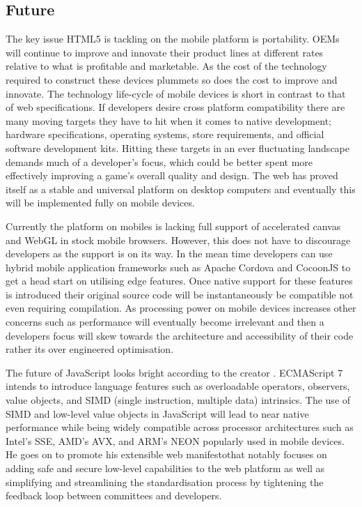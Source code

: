 \documentclass[final]{cmpreport}
\begin{document}
\subsection{Future}
The key issue HTML5 is tackling on the mobile platform is portability. OEMs will continue to improve and innovate their product lines at different rates relative to what is profitable and marketable. As the cost of the technology required to construct these devices plummets so does the cost to improve and innovate. The technology life-cycle of mobile devices is short in contrast to that of web specifications. If developers desire cross platform compatibility there are many moving targets they have to hit when it comes to native development; hardware specifications, operating systems, store requirements, and official software development kits. Hitting these targets in an ever fluctuating landscape demands much of a developer's focus, which could be better spent more effectively improving a game's overall quality and design. The web has proved itself as a stable and universal platform on desktop computers and eventually this will be implemented fully on mobile devices.

Currently the platform on mobiles is lacking full support of accelerated canvas and WebGL in stock mobile browsers. However, this does not have to discourage developers as the support is on its way. In the mean time developers can use hybrid mobile application frameworks such as Apache Cordova and CocoonJS to get a head start on utilising edge features. Once native support for these features is introduced their original source code will be instantaneously be compatible not even requiring compilation. As processing power on mobile devices increases other concerns such as performance will eventually become irrelevant and then a developers focus will skew towards the architecture and accessibility of their code rather its over engineered optimisation.

The future of JavaScript looks bright according to the creator \citet{Eich}. ECMAScript 7 intends to introduce language features such as overloadable operators, observers, value objects, and SIMD (single instruction, multiple data) intrinsics. The use of SIMD and low-level value objects in JavaScript will lead to near native performance while being widely compatible across processor architectures such as Intel's SSE, AMD's AVX, and ARM's NEON popularly used in mobile devices. He goes on to promote his extensible web manifesto\footnotemark that notably focuses on adding safe and secure low-level capabilities to the web platform as well as simplifying and streamlining the standardisation process by tightening the feedback loop between committees and developers.
\end{document}
